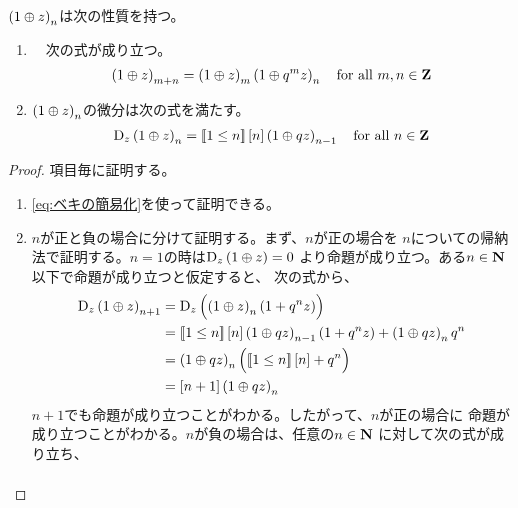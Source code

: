 {	\begin{proposition}[ベキの微分その二]\label{prop:ベキの微分その二} %
		$\mathinner{({1\oplus z})}_n$は次の性質を持つ。
		\begin{enumerate}\setlength{\itemsep}{-1mm} %
			\item　次の式が成り立つ。
			\begin{equation*}\begin{split}
				\mathinner{({1\oplus z})}_{m+n} = \mathinner{({1\oplus z})}_m\mathinner{({1\oplus q^mz})}_n
				\quad\text{for all } m,n\in\mathbf{Z}
			\end{split}\end{equation*}
			\item $\mathinner{({1\oplus z})}_n$の微分は次の式を満たす。
			\begin{equation*}\begin{split}
				{\mathinner{\operatorname{D}}}_z\mathinner{({1\oplus z})}_n = \mathinner{[\![1\le n]\!]}{\mathinner{[{n}]}}\mathinner{({1\oplus qz})}_{n-1}
				\quad\text{for all } n\in\mathbf{Z}
			\end{split}\end{equation*}
		\end{enumerate} %
	\end{proposition} %
	\begin{proof} %
		項目毎に証明する。
		\begin{enumerate}\setlength{\itemsep}{-1mm} %
			\item \eqref{eq:ベキの簡易化}を使って証明できる。
			\item $n$が正と負の場合に分けて証明する。まず、$n$が正の場合を
			$n$についての帰納法で証明する。$n=1$の時は${\mathinner{\operatorname{D}}}_z\mathinner{({1\oplus z})}=0$
			より命題が成り立つ。ある$n\in\mathbf{N}$以下で命題が成り立つと仮定すると、
			次の式から、
			\begin{equation*}\begin{split}
				{\mathinner{\operatorname{D}}}_z\mathinner{({1\oplus z})}_{n+1}
				&= {\mathinner{\operatorname{D}}}_z\mathinner{\Bigl({\mathinner{({1\oplus z})}_n\mathinner{({1 + q^nz})}}\Bigr)} \\
				&= \mathinner{[\![1\le n]\!]}{\mathinner{[{n}]}}\mathinner{({1\oplus qz})}_{n-1}\mathinner{({1 + q^nz})}
					+ \mathinner{({1\oplus qz})}_nq^n \\
				&= \mathinner{({1\oplus qz})}_n\mathinner{\Bigl({\mathinner{[\![1\le n]\!]}{\mathinner{[{n}]}} + q^n}\Bigr)} \\
				&= {\mathinner{[{n+1}]}}\mathinner{({1\oplus qz})}_n \\
			\end{split}\end{equation*}
			$n+1$でも命題が成り立つことがわかる。したがって、$n$が正の場合に
			命題が成り立つことがわかる。$n$が負の場合は、任意の$n\in\mathbf{N}$
			に対して次の式が成り立ち、
			\begin{equation*}\begin{split}

\end{split}
\end{equation*}
\end{enumerate}
\end{proof}}
